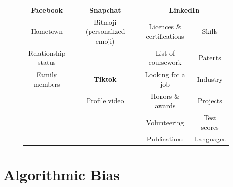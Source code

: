 \documentclass[11pt]{article} %
\begin{document}
\begin{figure}[tb]
\begin{minipage}{\textwidth}
\begin{tabular}{clclcc}
\textbf{Facebook}   &  & \textbf{Snapchat}            &  & \multicolumn{2}{c}{\textbf{LinkedIn}}    \\ \cline{1-1} \cline{3-3} \cline{5-6} 
Hometown            &  & Bitmoji (personalized emoji) &  & Licences \& certifications & Skills      \\
Relationship status &  &                              &  & List of coursework         & Patents     \\
Family members      &  & \textbf{Tiktok}              &  & Looking for a job          & Industry    \\ \cline{3-3}
                    &  & Profile video                &  & Honors \& awards           & Projects    \\
                    &  &                              &  & Volunteering               & Test scores \\
                    &  &                              &  & Publications               & Languages  
        \end{tabular} 
    \end{minipage}
\end{figure}

\section{Algorithmic Bias}
\label{sec:bias} 
\end{document}
